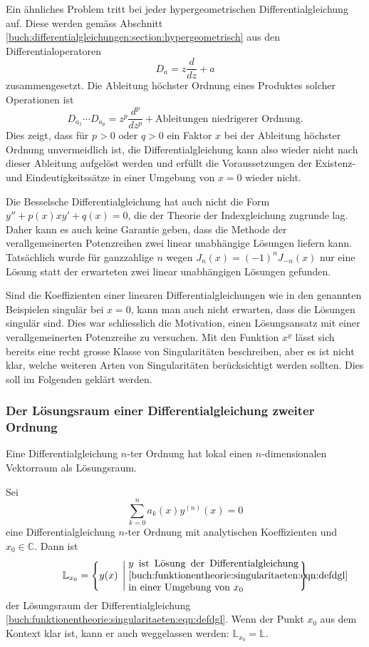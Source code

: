 Ein ähnliches Problem tritt bei jeder hypergeometrischen
Differentialgleichung auf.
Diese werden gemäss Abschnitt
\ref{buch:differentialgleichungen:section:hypergeometrisch}
aus den Differentialoperatoren
\[
D_a=z\frac{d}{dz} + a
\]
zusammengesetzt.
Die Ableitung höchster Ordnung eines Produktes solcher Operationen ist
\[
D_{a_1}
\cdots
D_{a_p}
=
z^p\frac{d^p}{dz^p} + \text{Ableitungen niedrigerer Ordnung}.
\]
Dies zeigt, dass für $p>0$ oder $q>0$ ein Faktor $x$ bei der
Ableitung höchster Ordnung unvermeidlich ist, die Differentialgleichung
kann also wieder nicht nach dieser Ableitung aufgelöst werden und
erfüllt die Voraussetzungen der Existenz- und Eindeutigkeitssätze
in einer Umgebung von $x=0$ wieder nicht.

Die Besselsche Differentialgleichung
hat auch nicht die Form $y''+p(x)xy'+q(x)=0$, die der Theorie der 
Indexgleichung zugrunde lag.
Daher kann es auch keine Garantie geben, dass die Methode der
verallgemeinerten Potenzreihen zwei linear unabhängige Lösungen
liefern kann.
Tatsächlich wurde für ganzzahlige $n$ wegen $J_n(x) = (-1)^n J_{-n}(x)$
nur eine Lösung statt der erwarteten zwei linear unabhängigen
Lösungen gefunden.

Sind die Koeffizienten einer linearen Differentialgleichungen wie
in den genannten Beispielen singulär bei $x=0$, kann man auch nicht
erwarten, dass die Lösungen singulär sind.
Dies war schliesslich die Motivation, einen Lösungsansatz mit einer
verallgemeinerten Potenzreihe zu versuchen.
Mit den Funktion $x^\varrho$ lässt sich bereits eine recht grosse
Klasse von Singularitäten beschreiben, aber es ist nicht klar,
welche weiteren Arten von Singularitäten berücksichtigt werden sollten.
Dies soll im Folgenden geklärt werden.

\subsubsection{Der Lösungsraum einer Differentialgleichung zweiter Ordnung}
Eine Differentialgleichung $n$-ter Ordnung hat lokal einen $n$-dimensionalen
Vektorraum als Lösungsraum.

\begin{definition}
Sei 
\begin{equation}
\sum_{k=0}^n a_k(x) y^{(n)}(x) = 0
\label{buch:funktionentheorie:singularitaeten:eqn:defdgl}
\end{equation}
eine Differentialgleichung $n$-ter Ordnung mit analytischen Koeffizienten
und $x_0\in \mathbb{C}$.
Dann ist
\[
\mathbb{L}_{x_0}
=
\left\{
y(x)
\;\left|\;
\begin{minipage}{6cm}
$y$ ist Lösung der Differentialgleichung
\eqref{buch:funktionentheorie:singularitaeten:eqn:defdgl}
in einer Umgebung von $x_0$
\end{minipage}
\right.
\right\}
\]
der Lösungsraum der Differentialgleichung
\eqref{buch:funktionentheorie:singularitaeten:eqn:defdgl}.
Wenn der Punkt $x_0$ aus dem Kontext klar ist, kann er auch weggelassen
werden: $\mathbb{L}_{x_0}=\mathbb{L}$.
\end{definition}

